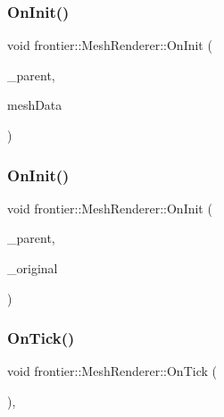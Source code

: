 \subsubsection{\texorpdfstring{On\+Init()}{OnInit()}\hspace{0.1cm}{\footnotesize\ttfamily [1/2]}}
{\footnotesize\ttfamily void frontier\+::\+Mesh\+Renderer\+::\+On\+Init (\begin{DoxyParamCaption}\item[{std\+::weak\+\_\+ptr$<$ \hyperlink{classfrontier_1_1_entity}{Entity} $>$}]{\+\_\+parent,  }\item[{std\+::shared\+\_\+ptr$<$ \hyperlink{classfrontier_1_1_model}{Model} $>$}]{mesh\+Data }\end{DoxyParamCaption})}

\mbox{\label{classfrontier_1_1_mesh_renderer_a27e5a0fdf24ffdae6555f2d132adf3f4}} 
\subsubsection{\texorpdfstring{On\+Init()}{OnInit()}\hspace{0.1cm}{\footnotesize\ttfamily [2/2]}}
{\footnotesize\ttfamily void frontier\+::\+Mesh\+Renderer\+::\+On\+Init (\begin{DoxyParamCaption}\item[{std\+::weak\+\_\+ptr$<$ \hyperlink{classfrontier_1_1_entity}{Entity} $>$}]{\+\_\+parent,  }\item[{std\+::weak\+\_\+ptr$<$ \hyperlink{classfrontier_1_1_mesh_renderer}{Mesh\+Renderer} $>$}]{\+\_\+original }\end{DoxyParamCaption})}

\mbox{\label{classfrontier_1_1_mesh_renderer_acffde7174ddb009751e360df5d346922}} 
\subsubsection{\texorpdfstring{On\+Tick()}{OnTick()}}
{\footnotesize\ttfamily void frontier\+::\+Mesh\+Renderer\+::\+On\+Tick (\begin{DoxyParamCaption}{ }\end{DoxyParamCaption})\hspace{0.3cm}{\ttfamily [override]}, {\ttfamily [virtual]}}



